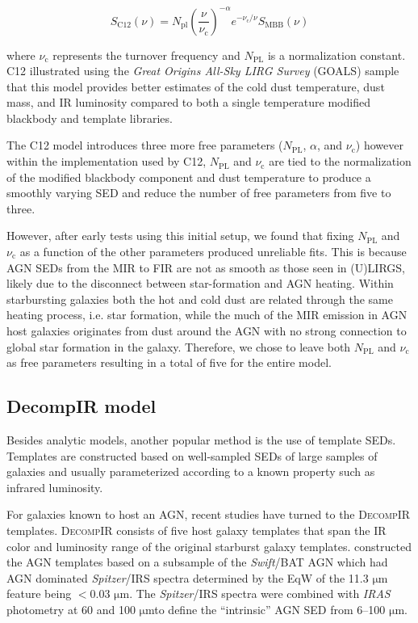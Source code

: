 \documentclass[fleqn,usenatbib]{mnras}
\newcommand{\um}{$\mathrm{\mu}$m}
\newcommand{\swift}{\textit{Swift}}
\begin{document}
\begin{equation}\label{eq:casey}
S_{\mathrm{C12}}(\nu) = N_{\mathrm{pl}}\left(\frac{\nu}{\nu_{\mathrm{c}}}\right)^{-\alpha}e^{-\nu_{\mathrm{c}}/\nu}S_{\mathrm{MBB}}(\nu)
\end{equation}

\noindent where $\nu_{\mathrm{c}}$ represents the turnover frequency and $N_{\mathrm{PL}}$ is a normalization constant. C12 illustrated using the \textit{Great Origins All-Sky LIRG Survey} (GOALS) sample that this model provides better estimates of the cold dust temperature, dust mass, and IR luminosity compared to both a single temperature modified blackbody and template libraries.

The C12 model introduces three more free parameters ($N_{\mathrm{PL}}$, $\alpha$, and $\nu_{\mathrm{c}}$) however within the implementation used by C12, $N_{\mathrm{PL}}$ and $\nu_{\mathrm{c}}$ are tied to the normalization of the modified blackbody component and dust temperature to produce a smoothly varying SED and reduce the number of free parameters from five to three. 

However, after early tests using this initial setup, we found that fixing $N_{\mathrm{PL}}$ and $\nu_{\mathrm{c}}$ as a function of the other parameters produced unreliable fits. This is because AGN SEDs from the MIR to FIR are not as smooth as those seen in (U)LIRGS, likely due to the disconnect between star-formation and AGN heating. Within starbursting galaxies both the hot and cold dust are related through the same heating process, i.e. star formation, while the much of the MIR emission in AGN host galaxies originates from dust around the AGN with no strong connection to global star formation in the galaxy. Therefore, we chose to leave both $N_{\mathrm{PL}}$ and $\nu_{\mathrm{c}}$ as free parameters resulting in a total of five for the entire model.

\subsection{DecompIR model}
Besides analytic models, another popular method is the use of template SEDs. Templates are constructed based on well-sampled SEDs of large samples of galaxies and usually parameterized according to a known property such as infrared luminosity.

For galaxies known to host an AGN, recent studies have turned to the \textsc{DecompIR} \citep{Mullaney:2011yq} templates. \textsc{DecompIR} consists of five host galaxy templates that span the IR color and luminosity range of the original \citet{Brandl:2006kx} starburst galaxy templates. \citet{Mullaney:2011yq} constructed the AGN templates based on a subsample of the \swift/BAT AGN which had AGN dominated \textit{Spitzer}/IRS spectra determined by the EqW of the 11.3 \um{} feature being $<0.03$ \um. The \textit{Spitzer}/IRS spectra were combined with \textit{IRAS} photometry at 60 and 100 \um to define the ``intrinsic'' AGN SED from 6--100 \um. 
\end{document}
